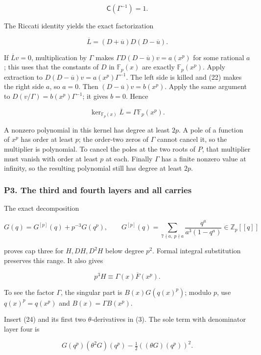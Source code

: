\documentclass[11pt,a4paper]{article}
\begin{document}
\[
\mathsf C(\Gamma^{-1})=1.\tag{22}
\]

The Riccati identity yields the exact factorization

\[
\overline L=(D+\overline u)D(D-\overline u).
\]

If \(\overline{L}v=0\), multiplication by \(Γ\) makes \(ΓD(D-\overline{u})v=a(x^p)\) for some rational \(a\); this uses that the constants of \(D\) in \(\mathbb{F}_p(x)\) are exactly \(\mathbb{F}_p(x^p)\). Apply extraction to \(D(D-\overline{u})v=a(x^p)Γ^{-1}\). The left side is killed and (22) makes the right side \(a\), so \(a=0\). Then \((D-\overline{u})v=b(x^p)\). Apply the same argument to \(D(v/Γ)=b(x^p)Γ^{-1}\); it gives \(b=0\). Hence

\[
\ker_{\mathbb F_p(x)}\overline L=\Gamma\mathbb F_p(x^p).\tag{23}
\]

A nonzero polynomial in this kernel has degree at least \(2p\). A pole of a function of \(x^p\) has order at least \(p\); the order-two zeros of \(Γ\) cannot cancel it, so the multiplier is polynomial. To cancel the poles at the two roots of \(P\), that multiplier must vanish with order at least \(p\) at each. Finally \(Γ\) has a finite nonzero value at infinity, so the resulting polynomial still has degree at least \(2p\).

\hypertarget{p3.-the-third-and-fourth-layers-and-all-carries}{%
\subsubsection{P3. The third and fourth layers and all carries}\label{p3.-the-third-and-fourth-layers-and-all-carries}}

The exact decomposition

\[
G(q)=G^{[p]}(q)+p^{-3}G(q^p),\qquad
G^{[p]}(q)=\sum_{7\nmid a,\ p\nmid a}\frac{q^a}{a^3(1-q^a)}\in\mathbb Z_p[[q]]\tag{24}
\]

proves cap three for \(H,DH,D^{2}H\) below degree \(p^{2}\). Formal integral substitution preserves this range. It also gives

\[
p^3H\equiv\Gamma(x)\overline F(x^p).\tag{25}
\]

To see the factor \(Γ\), the singular part is \(B(x)G(q(x)^p)\); modulo \(p\), use \(q(x)^p=q(x^p)\) and \(B(x)=ΓB(x^p)\).

Insert (24) and its first two \(θ\)-derivatives in (3). The sole term with denominator layer four is

\[
G(q^p)(\theta^2G)(q^p)-\tfrac12((\theta G)(q^p))^2.
\]
\end{document}
